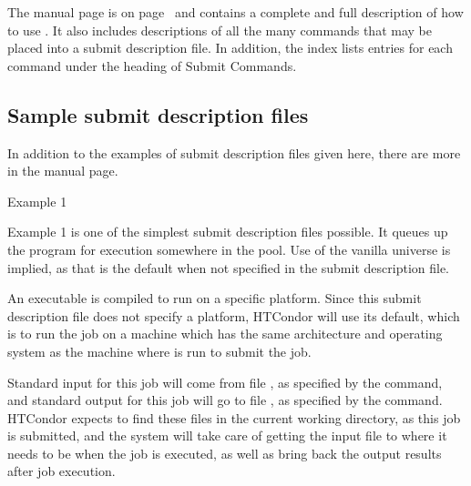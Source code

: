 The  manual page 
is on page~\pageref{man-condor-submit} and
contains a complete and full description of how to use .
It also includes descriptions of all the many commands that may be placed
into a submit description file.
In addition, the index lists entries for each command under the
heading of Submit Commands.

\subsection{\label{sec:sample-submit-files}Sample submit description files}  

In addition to the examples of submit description files given
here, there are more in the  manual page.

\begin{description}
\item[Example 1]
\end{description}
Example 1 is one of the simplest submit description files possible. 
It queues up the program  for execution somewhere in the pool. 
Use of the vanilla universe is implied, as that is the default when
not specified in the submit description file.

An executable is compiled to run on a specific platform.
Since this submit description file does not specify a platform,
HTCondor will use its default,
which is to run the job on a machine which has the same architecture 
and operating system as the machine where  is run
to submit the job. 

Standard input for this job will come from file ,
as specified by the  command,
and standard output for this job will go to file ,
as specified by the  command.
HTCondor expects to find these files in the current working directory,
as this job is submitted,
and the system will take care of getting the input file 
to where it needs to be when the job is executed,
as well as bring back the output results after job execution.


